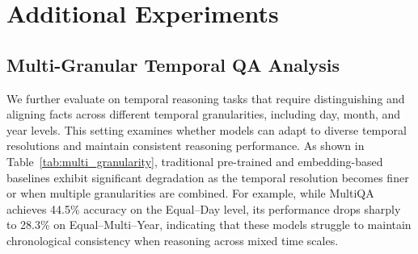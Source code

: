 











\vspace{5mm}
\section{Additional Experiments}
\label{appendxi:add_exp}


\subsection{Multi-Granular Temporal QA Analysis}
\label{appendxi:mutlti-}

We further evaluate \mot on temporal reasoning tasks that require distinguishing and aligning facts across different temporal granularities, including day, month, and year levels. 
This setting examines whether models can adapt to diverse temporal resolutions and maintain consistent reasoning performance.  
As shown in Table~\ref{tab:multi_granularity}, traditional pre-trained and embedding-based baselines exhibit significant degradation as the temporal resolution becomes finer or when multiple granularities are combined.
For example, while MultiQA achieves 44.5\% accuracy on the Equal–Day level, its performance drops sharply to 28.3\% on Equal–Multi–Year, indicating that these models struggle to maintain chronological consistency when reasoning across mixed time scales.

